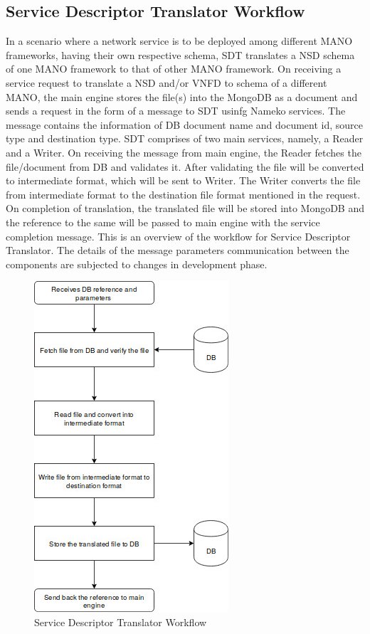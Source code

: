 \subsection{Service Descriptor Translator Workflow}
In a scenario where a network service is to be deployed among different MANO frameworks, having their own respective schema, SDT translates a NSD schema of one MANO framework to that of other MANO framework.
On receiving a service request to translate a NSD and/or VNFD to schema of a different MANO, the main engine stores the file(s) into the MongoDB as a document and sends a request in the form of a message to SDT usinfg Nameko services. The message contains the information of DB document name and document id, source type and destination type. 
SDT comprises of two main services, namely, a Reader and a Writer. On receiving the message from main engine, the Reader fetches the file/document from DB and validates it. After validating the file will be converted to intermediate format, which will be sent to Writer. The Writer converts the file from intermediate format to the destination file format mentioned in the request. On completion of translation, the translated file will be stored into MongoDB and the reference to the same will be passed to main engine with the service completion message.
This is an overview of the workflow for Service Descriptor Translator. The details of the message parameters communication between the components are subjected to changes in development phase.
\begin{figure}
	\centering
	\includegraphics[width=0.5\linewidth]{figures/SDT_Workflow}
	\caption{Service Descriptor Translator Workflow}
	\label{fig:SDT Workflow}
\end{figure}

   





